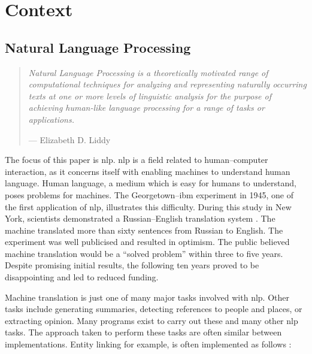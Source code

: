 \chapter{Context}\label{context}

\glsresetall

\section{Natural Language Processing}\label{natural-language-processing}

\begin{quote}
  \textit{Natural Language Processing is a theoretically motivated range
    of computational techniques for analyzing and representing
    naturally occurring texts at one or more levels of linguistic
    analysis for the purpose of achieving human-like language processing
    for a range of tasks or applications.
  }

  \medskip
  --- Elizabeth D. Liddy \autocite*{natural-language-processing-liddy-2001}
\end{quote}

\noindent The focus of this paper is \gls{nlp}.
\gls{nlp} is a field related to human--computer interaction, as it
  concerns itself with enabling machines to understand human language.
Human language, a medium which is easy for humans to understand, poses
  problems for machines.
The Georgetown--\gls{ibm} experiment in 1945, one of the first application
  of \gls{nlp}, illustrates this difficulty.
During this study in New York, scientists demonstrated a
  Russian--English translation system
  \autocite{hutchins-john-georgetown-ibm-system}.
The machine translated more than sixty sentences from Russian to English.
The experiment was well publicised and resulted in optimism.
The public believed machine translation would be a ``solved problem'' within
  three to five years.
Despite promising initial results, the following ten years proved to be
  disappointing and led to reduced funding.

Machine translation is just one of many major tasks involved with \gls{nlp}.
Other tasks include generating summaries, detecting references to people
  and places, or extracting opinion.
Many programs exist to carry out these and many other \gls{nlp} tasks.
The approach taken to perform these tasks are often similar between
  implementations.
Entity linking for example, is often implemented as follows
  \autocite[according to][]{stanbol-enhancer-nlp}:

